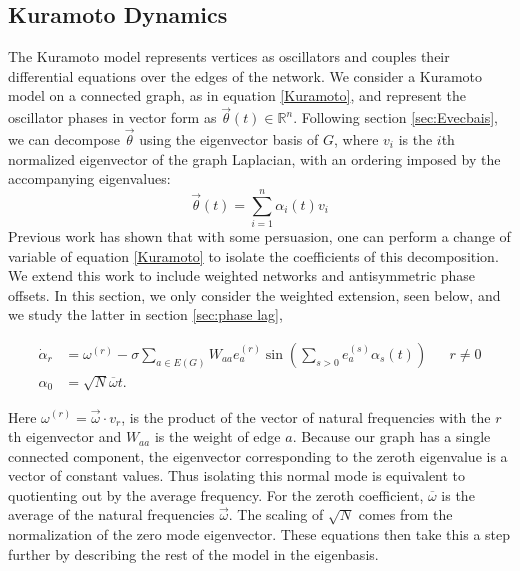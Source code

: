 \documentclass[%
 aip,
 amsmath,amssymb,
preprint,
reprint, onecolumn %
]{revtex4-1}
\newcommand{\R}{\mathbb{R}}
\begin{document}
\subsection{Kuramoto Dynamics}\label{K-Dynamics}

The Kuramoto model represents vertices as oscillators and  couples their differential equations over the edges of the network. 
We consider a Kuramoto model on a connected graph, as in equation \ref{Kuramoto}, and represent the oscillator phases in vector form as $\vec{\theta}(t)\in \R^n$.
Following section \ref{sec:Evecbais}, we can decompose $\vec{\theta}$ using the eigenvector basis of $G$, where $v_i$ is the $i$th normalized eigenvector of the graph Laplacian, with an ordering imposed by the accompanying eigenvalues:
\[
\vec{\theta}(t) = \sum_{i=1}^n \alpha_i(t) v_i
\]
Previous work has shown that with some persuasion, one can perform a change of variable of equation \ref{Kuramoto} to isolate the coefficients of this decomposition.\cite{kalloniatis_incoherence_2010} We extend this work to include weighted networks and antisymmetric phase offsets. In this section, we only consider the weighted extension, seen below, and we study the latter in section \ref{sec:phase lag},

\begin{align}\label{coeffeqn}
    \dot{\alpha}_r &= \omega^{(r)} - \sigma \sum_{a\in E(G)} W_{aa}   e_a^{(r)} \sin\left( \sum_{s>0} e_a^{(s)}\alpha_s(t)\right)
    && r\not=0\\
    \alpha_0 &= \sqrt{N} \overline{\omega} t.
\end{align}

Here $\omega^{(r)}=\vec{\omega}\cdot v_r$, is the product of the vector of natural frequencies with the $r$th eigenvector and $W_{aa}$ is the weight of edge $a$. Because our graph has a single connected component, the eigenvector corresponding to the zeroth eigenvalue is a vector of constant values. Thus isolating this normal mode is equivalent to quotienting out by the average frequency. For the zeroth coefficient, $\overline{\omega}$ is the average of the natural frequencies $\vec{\omega}$. The scaling of $\sqrt{N}$ comes from the normalization of the zero mode eigenvector. These equations then take this a step further by describing the rest of the model in the eigenbasis.
\end{document}
